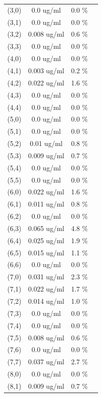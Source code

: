 \documentclass{article}
\begin{document}
\begin{tabular}{c c c c}
(3,0)&        0.0 ug/ml        &0.0 \%\\
(3,1)&        0.0 ug/ml        &0.0 \%\\
(3,2)&        0.008 ug/ml        &0.6 \%\\
(3,3)&        0.0 ug/ml        &0.0 \%\\
(4,0)&        0.0 ug/ml        &0.0 \%\\
(4,1)&        0.003 ug/ml        &0.2 \%\\
(4,2)&        0.022 ug/ml        &1.6 \%\\
(4,3)&        0.0 ug/ml        &0.0 \%\\
(4,4)&        0.0 ug/ml        &0.0 \%\\
(5,0)&        0.0 ug/ml        &0.0 \%\\
(5,1)&        0.0 ug/ml        &0.0 \%\\
(5,2)&        0.01 ug/ml        &0.8 \%\\
(5,3)&        0.009 ug/ml        &0.7 \%\\
(5,4)&        0.0 ug/ml        &0.0 \%\\
(5,5)&        0.0 ug/ml        &0.0 \%\\
(6,0)&        0.022 ug/ml        &1.6 \%\\
(6,1)&        0.011 ug/ml        &0.8 \%\\
(6,2)&        0.0 ug/ml        &0.0 \%\\
(6,3)&        0.065 ug/ml        &4.8 \%\\
(6,4)&        0.025 ug/ml        &1.9 \%\\
(6,5)&        0.015 ug/ml        &1.1 \%\\
(6,6)&        0.0 ug/ml        &0.0 \%\\
(7,0)&        0.031 ug/ml        &2.3 \%\\
(7,1)&        0.022 ug/ml        &1.7 \%\\
(7,2)&        0.014 ug/ml        &1.0 \%\\
(7,3)&        0.0 ug/ml        &0.0 \%\\
(7,4)&        0.0 ug/ml        &0.0 \%\\
(7,5)&        0.008 ug/ml        &0.6 \%\\
(7,6)&        0.0 ug/ml        &0.0 \%\\
(7,7)&        0.037 ug/ml        &2.7 \%\\
(8,0)&        0.0 ug/ml        &0.0 \%\\
(8,1)&        0.009 ug/ml        &0.7 \%\\

\end{tabular}
\end{document}
